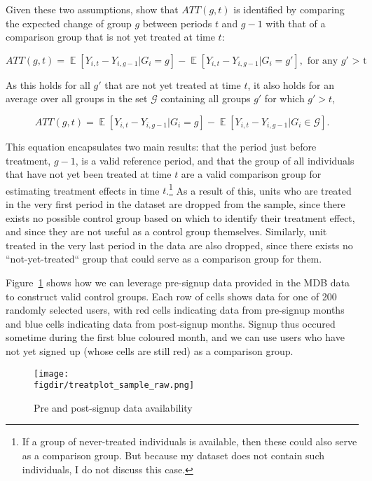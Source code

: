 Given these two assumptions, \citet{callaway2021difference} show that
$ATT(g,t)$ is identified by comparing the expected change of group $g$ between
periods $t$ and $g-1$ with that of a comparison group that is not yet treated
at time $t$:

\begin{equation}
    ATT(g,t) = \mathop{\mathbb{E}}[Y_{i,t} - Y_{i,g-1}|G_i = g] -
    \mathop{\mathbb{E}}[Y_{i,t} - Y_{i,g-1}|G_i = g'], \text{ for any $g'$ > t} 
\end{equation}

As this holds for all $g'$ that are not yet treated at time $t$, it also holds
for an average over all groups in the set $\mathcal{G}$ containing all groups
$g'$ for which $g' > t$,

\begin{equation}
    ATT(g,t) = \mathop{\mathbb{E}}[Y_{i,t} - Y_{i,g-1}|G_i = g] -
    \mathop{\mathbb{E}}[Y_{i,t} - Y_{i,g-1}|G_i \in \mathcal{G}].
\end{equation}

This equation encapsulates two main results: that the period just before
treatment, $g-1$, is a valid reference period, and that the group of all
individuals that have not yet been treated at time $t$ are a valid comparison
group for estimating treatment effects in time $t$.\footnote{If a group of
never-treated individuals is available, then these could also serve as a
comparison group. But because my dataset does not contain such individuals, I
do not discuss this case.} As a result of this, units who are treated in the
very first period in the dataset are dropped from the sample, since there
exists no possible control group based on which to identify their treatment
effect, and since they are not useful as a control group themselves. Similarly,
unit treated in the very last period in the data are also dropped, since there
exists no ``not-yet-treated`` group that could serve as a comparison group for
them.

Figure~\ref{fig:treatplot} shows how we can leverage
pre-signup data provided in the MDB data to construct valid control groups.
Each row of cells shows data for one of 200 randomly selected users, with red
cells indicating data from pre-signup months and blue cells indicating data
from post-signup months. Signup thus occured sometime during the first blue
coloured month, and we can use users who have not yet signed up (whose cells
are still red) as a comparison group.

\begin{figure}[H]
    \centering
    \caption{Pre and post-signup data availability}%
    \texttt{[image: \\figdir/treatplot\_sample\_raw.png]}
    \label{fig:treatplot}
\end{figure}


